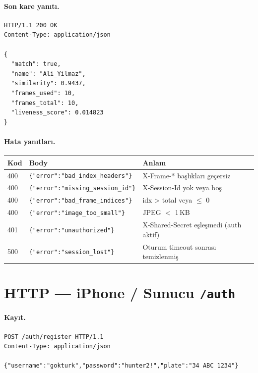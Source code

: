 \paragraph{Son kare yanıtı.}

\begin{lstlisting}[language=none, basicstyle=\ttfamily\footnotesize]
HTTP/1.1 200 OK
Content-Type: application/json

{
  "match": true,
  "name": "Ali_Yilmaz",
  "similarity": 0.9437,
  "frames_used": 10,
  "frames_total": 10,
  "liveness_score": 0.014823
}
\end{lstlisting}

\paragraph{Hata yanıtları.}

\begin{tabular}{l l l}
\toprule
\textbf{Kod} & \textbf{Body} & \textbf{Anlam}\\
\midrule
400 & \texttt{\{"error":"bad\_index\_headers"\}}    & X-Frame-* başlıkları geçersiz\\
400 & \texttt{\{"error":"missing\_session\_id"\}}   & X-Session-Id yok veya boş\\
400 & \texttt{\{"error":"bad\_frame\_indices"\}}    & idx > total veya $\leq$ 0\\
400 & \texttt{\{"error":"image\_too\_small"\}}      & JPEG $<$ 1\,KB\\
401 & \texttt{\{"error":"unauthorized"\}}           & X-Shared-Secret eşleşmedi (auth aktif)\\
500 & \texttt{\{"error":"session\_lost"\}}          & Oturum timeout sonrası temizlenmiş\\
\bottomrule
\end{tabular}

\section{HTTP --- iPhone / Sunucu \texttt{/auth}}

\paragraph{Kayıt.}

\begin{lstlisting}[language=none, basicstyle=\ttfamily\footnotesize]
POST /auth/register HTTP/1.1
Content-Type: application/json

{"username":"gokturk","password":"hunter2!","plate":"34 ABC 1234"}
\end{lstlisting}


